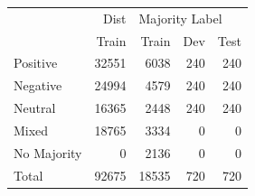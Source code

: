 \begin{tabular}{lrrrr}
\toprule
{} &   Dist & \multicolumn{3}{l}{Majority Label} \\
{} &  Train &          Train &  Dev & Test \\
\midrule
Positive    &  32551 &           6038 &  240 &  240 \\
Negative    &  24994 &           4579 &  240 &  240 \\
Neutral     &  16365 &           2448 &  240 &  240 \\
Mixed       &  18765 &           3334 &    0 &    0 \\
No Majority &      0 &           2136 &    0 &    0 \\
Total       &  92675 &          18535 &  720 &  720 \\
\bottomrule
\end{tabular}
